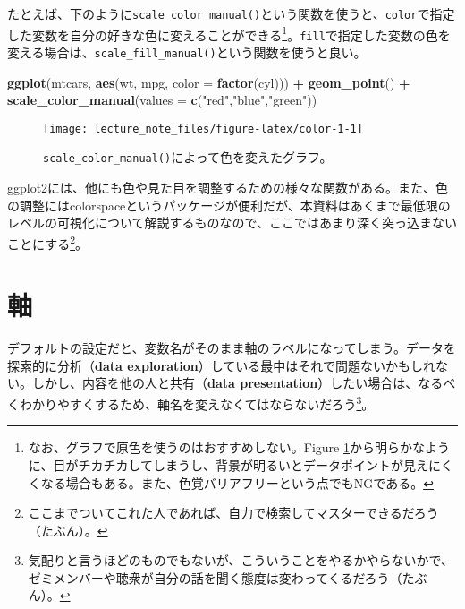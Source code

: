 \documentclass[]{book}
\newenvironment{Shaded}{\begin{snugshade}}{\end{snugshade}}
\newcommand{\KeywordTok}[1]{\textcolor[rgb]{0.13,0.29,0.53}{\textbf{#1}}}
\newcommand{\DataTypeTok}[1]{\textcolor[rgb]{0.13,0.29,0.53}{#1}}
\newcommand{\StringTok}[1]{\textcolor[rgb]{0.31,0.60,0.02}{#1}}
\newcommand{\OperatorTok}[1]{\textcolor[rgb]{0.81,0.36,0.00}{\textbf{#1}}}
\newcommand{\NormalTok}[1]{#1}
\let\rmarkdownfootnote\footnote%
\def\footnote{\protect\rmarkdownfootnote}
\begin{document}
たとえば、下のように\texttt{scale\_color\_manual()}という関数を使うと、\texttt{color}で指定した変数を自分の好きな色に変えることができる\footnote{なお、グラフで原色を使うのはおすすめしない。Figure
  \ref{fig:color-1}から明らかなように、目がチカチカしてしまうし、背景が明るいとデータポイントが見えにくくなる場合もある。また、色覚バリアフリーという点でもNGである。}。\texttt{fill}で指定した変数の色を変える場合は、\texttt{scale\_fill\_manual()}という関数を使うと良い。



\begin{Shaded}
\begin{Highlighting}[]
\KeywordTok{ggplot}\NormalTok{(mtcars, }\KeywordTok{aes}\NormalTok{(wt, mpg, }\DataTypeTok{color =} \KeywordTok{factor}\NormalTok{(cyl))) }\OperatorTok{+}
\StringTok{  }\KeywordTok{geom_point}\NormalTok{() }\OperatorTok{+}
\StringTok{  }\KeywordTok{scale_color_manual}\NormalTok{(}\DataTypeTok{values =} \KeywordTok{c}\NormalTok{(}\StringTok{"red"}\NormalTok{,}\StringTok{"blue"}\NormalTok{,}\StringTok{"green"}\NormalTok{))}
\end{Highlighting}
\end{Shaded}

\begin{figure}

{\centering \texttt{[image: lecture\_note\_files/figure-latex/color-1-1]} 

}

\caption{\texttt{scale\_color\_manual()}によって色を変えたグラフ。}\label{fig:color-1}
\end{figure}

ggplot2には、他にも色や見た目を調整するための様々な関数がある。また、色の調整にはcolorspaceというパッケージが便利だが、本資料はあくまで最低限のレベルの可視化について解説するものなので、ここではあまり深く突っ込まないことにする\footnote{ここまでついてこれた人であれば、自力で検索してマスターできるだろう（たぶん）。}。

\section{軸}

デフォルトの設定だと、変数名がそのまま軸のラベルになってしまう。データを探索的に分析（\textbf{data
exploration}）している最中はそれで問題ないかもしれない。しかし、内容を他の人と共有（\textbf{data
presentation}）したい場合は、なるべくわかりやすくするため、軸名を変えなくてはならないだろう\footnote{気配りと言うほどのものでもないが、こういうことをやるかやらないかで、ゼミメンバーや聴衆が自分の話を聞く態度は変わってくるだろう（たぶん）。}。
\end{document}
